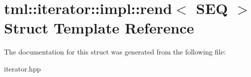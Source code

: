 \hypertarget{structtml_1_1iterator_1_1impl_1_1rend}{\section{tml\+:\+:iterator\+:\+:impl\+:\+:rend$<$ S\+E\+Q $>$ Struct Template Reference}
\label{structtml_1_1iterator_1_1impl_1_1rend}
}


The documentation for this struct was generated from the following file\+:\begin{DoxyCompactItemize}
\item 
iterator.\+hpp\end{DoxyCompactItemize}
